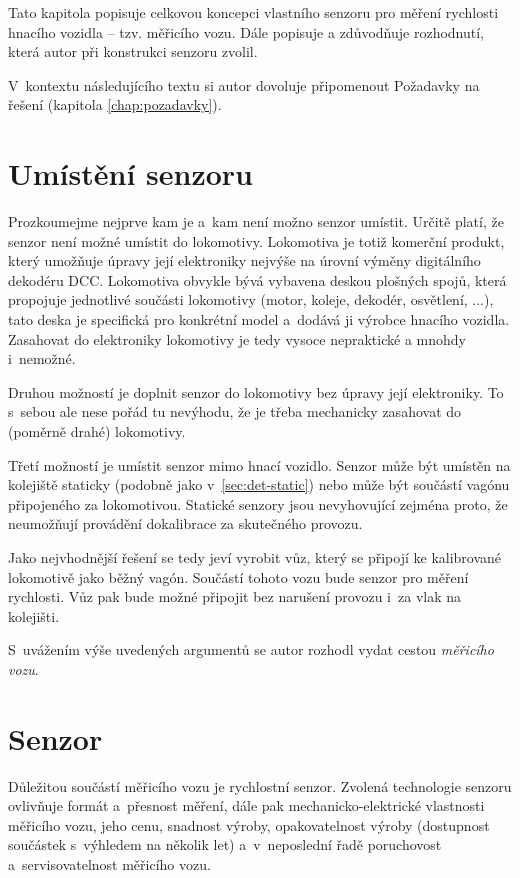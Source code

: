 Tato kapitola popisuje celkovou koncepci vlastního senzoru pro měření
rychlosti hnacího vozidla -- tzv. měřicího vozu. Dále popisuje
a zdůvodňuje rozhodnutí, která autor při konstrukci senzoru zvolil.

V~kontextu následujícího textu si autor dovoluje připomenout Požadavky
na řešení (kapitola \ref{chap:pozadavky}).

\section{Umístění senzoru}
\label{sec:wsm-senzor-umisteni}

Prozkoumejme nejprve kam je a~kam není možno senzor umístit. Určitě platí, že
senzor není možné umístit do lokomotivy. Lokomotiva je totiž komerční produkt,
který umožňuje úpravy její elektroniky nejvýše na úrovní výměny digitálního
dekodéru DCC. Lokomotiva obvykle bývá vybavena deskou plošných spojů, která
propojuje jednotlivé součásti lokomotivy (motor, koleje, dekodér, osvětlení,
...), tato deska je specifická pro konkrétní model a~dodává ji výrobce hnacího
vozidla. Zasahovat do elektroniky lokomotivy je tedy vysoce nepraktické a
mnohdy i~nemožné.

Druhou možností je doplnit senzor do lokomotivy bez úpravy její elektroniky.
To s~sebou ale nese pořád tu nevýhodu, že je třeba mechanicky zasahovat do
(poměrně drahé) lokomotivy.

Třetí možností je umístit senzor mimo hnací vozidlo. Senzor může být
umístěn na kolejiště staticky (podobně jako v~\ref{sec:det-static}) nebo může
být součástí vagónu připojeného za lokomotivou. Statické senzory jsou nevyhovující
zejména proto, že neumožňují provádění dokalibrace za skutečného provozu.

Jako nejvhodnější řešení se tedy jeví vyrobit vůz, který se připojí ke kalibrované
lokomotivě jako běžný vagón. Součástí tohoto vozu bude senzor pro měření
rychlosti. Vůz pak bude možné připojit bez narušení provozu i~za vlak na
 kolejišti.

S~uvážením výše uvedených argumentů se autor rozhodl vydat cestou
\textit{měřicího vozu}.

\section{Senzor}
\label{sec:wsm-senzor}

Důležitou součástí měřicího vozu je rychlostní senzor. Zvolená technologie
senzoru ovlivňuje formát a~přesnost měření, dále pak mechanicko-elektrické
vlastnosti měřicího vozu, jeho cenu, snadnost výroby, opakovatelnost výroby
(dostupnost součástek s~výhledem na několik let) a~v~neposlední řadě
poruchovost a~servisovatelnost měřicího vozu.

